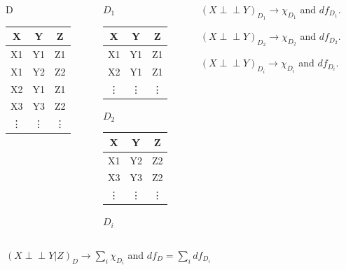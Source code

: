 \documentclass{beamer}
\def\ci{\perp\!\!\!\!\!\perp}
\begin{document}
\begin{frame}
	\frametitle{}
	\begin{block}{}
	\begin{columns}
		\begin{column}{0.2 \textwidth}
			\begin{block}{\centering D}
			\begin{tabular}{c c c}
				X  & Y  & Z \\
				\hline
				X1 & Y1 & Z1 \\
				X1 & Y2 & Z2 \\
				X2 & Y1 & Z1 \\
				X3 & Y3 & Z2 \\
				\vdots & \vdots & \vdots \\
			\end{tabular}
			\end{block}
		\end{column}
		\begin{column}{0.2 \textwidth}
			\begin{block}{\centering $D_1$}
				\begin{tabular}{c c c}
					X & Y & Z \\
					\hline
					X1 & Y1 & Z1 \\
					X2 & Y1 & Z1 \\
					\vdots & \vdots & \vdots \\
				\end{tabular}
			\end{block}
			\begin{block}{\centering $ D_2 $}
				\begin{tabular}{c c c}
					X & Y & Z \\
					\hline
					X1 & Y2 & Z2 \\
					X3 & Y3 & Z2 \\
					\vdots & \vdots & \vdots \\
				\end{tabular}
			\end{block}
			\begin{block}{\centering $ D_i $}
			\end{block}
		\end{column}
		\begin{column}{0.4 \textwidth}
			\begin{block}{}
				$(X \ci Y)_{D_1} \to \chi_{D_1} $ and $ df_{D_1} $.
			\end{block}
			\begin{block}{}
				$(X \ci Y)_{D_2} \to \chi_{D_2} $ and $ df_{D_2} $.
			\end{block}
			\begin{block}{}
				$(X \ci Y)_{D_i} \to \chi_{D_i} $ and $ df_{D_i} $.
			\end{block}
		\end{column}
	\end{columns}
	\end{block}
	\begin{block}{}
		\centering
		$ (X \ci Y | Z)_{D} \to \sum_i \chi_{D_i} $ and $ df_{D} = \sum_i df_{D_i} $
	\end{block}
\end{frame}
\end{document}
